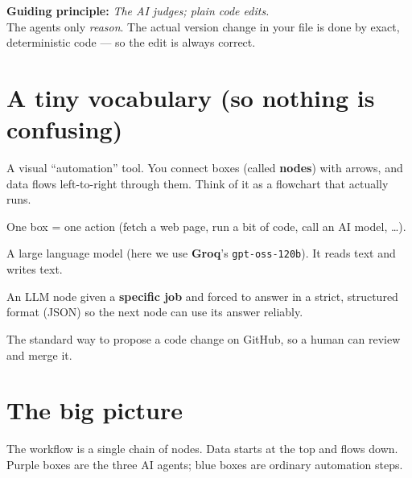 \documentclass[11pt,a4paper]{article}
\begin{document}
\begin{center}
\colorbox{soft}{\parbox{0.92\linewidth}{\centering\small
\textbf{Guiding principle:} \emph{The AI judges; plain code edits.}\\
The agents only \emph{reason}. The actual version change in your file is done by exact,
deterministic code --- so the edit is always correct.}}
\end{center}

\section{A tiny vocabulary (so nothing is confusing)}

\begin{description}[leftmargin=0em, style=nextline]
  \item[n8n] A visual ``automation'' tool. You connect boxes (called \textbf{nodes}) with arrows, and
    data flows left-to-right through them. Think of it as a flowchart that actually runs.
  \item[Node] One box = one action (fetch a web page, run a bit of code, call an AI model, \dots).
  \item[LLM / model] A large language model (here we use \textbf{Groq}'s \texttt{gpt-oss-120b}). It reads
    text and writes text.
  \item[Agent] An LLM node given a \textbf{specific job} and forced to answer in a strict, structured
    format (JSON) so the next node can use its answer reliably.
  \item[Pull Request (PR)] The standard way to propose a code change on GitHub, so a human can review
    and merge it.
\end{description}

\section{The big picture}

The workflow is a single chain of nodes. Data starts at the top and flows down. Purple boxes are the
three AI agents; blue boxes are ordinary automation steps.
\end{document}
